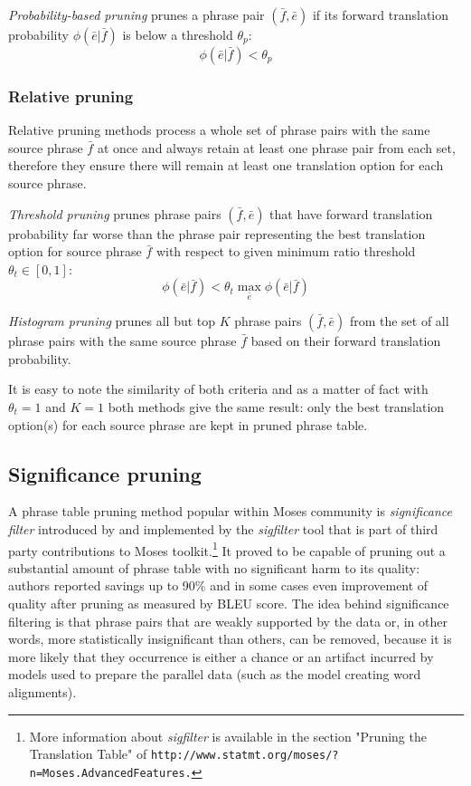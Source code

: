 \emph{Probability-based pruning} prunes a phrase pair $(\bar{f},\bar{e})$ if its forward
translation probability $\phi(\bar{e}|\bar{f})$ is below a threshold $\theta_{p}$:
\begin{equation}
  \phi(\bar{e}|\bar{f}) < \theta_{p}
\end{equation}

\subsubsection*{Relative pruning}

Relative pruning methods process a whole set of phrase pairs with the same source phrase
$\bar{f}$ at once and always retain at least one phrase pair from each set, therefore they
ensure there will remain at least one translation option for each source phrase.

\emph{Threshold pruning} prunes phrase pairs $(\bar{f},\bar{e})$ that have forward translation
probability far worse than the phrase pair representing the best translation option for source
phrase $\bar{f}$ with respect to given minimum ratio threshold $\theta_{t} \in [0,1]$:
\begin{equation}
  \phi(\bar{e}|\bar{f}) < \theta_{t} \max_{\bar{e}}{\phi(\bar{e}|\bar{f})}
\end{equation}

\emph{Histogram pruning} prunes all but top $K$ phrase pairs $(\bar{f},\bar{e})$ from the set
of all phrase pairs with the same source phrase $\bar{f}$ based on their forward translation
probability.

It is easy to note the similarity of both criteria and as a matter of fact with $\theta_{t} = 1$
and $K = 1$ both methods give the same result: only the best translation option(s) for each
source phrase are kept in pruned phrase table.

\subsection{Significance pruning}
\label{sec:significance-pruning}

A phrase table pruning method popular within Moses community is \emph{significance filter}
introduced by \citet{johnson:sigfilter} and implemented by the \emph{sigfilter} tool
that is part of third party contributions to Moses toolkit.\footnote{More information
about \emph{sigfilter} is available in the section "Pruning the Translation Table" of
\tt{http://www.statmt.org/moses/?n=Moses.AdvancedFeatures}.}
It proved to be capable of pruning out a substantial amount of phrase table with no
significant harm to its quality: authors reported savings up to 90\% and in some cases
even improvement of quality after pruning as measured by BLEU score.
The idea behind significance filtering is that phrase pairs that are weakly supported
by the data or, in other words, more statistically insignificant than others, can be
removed, because it is more likely that they occurrence is either a chance or an artifact
incurred by models used to prepare the parallel data (such as the model creating word
alignments).


